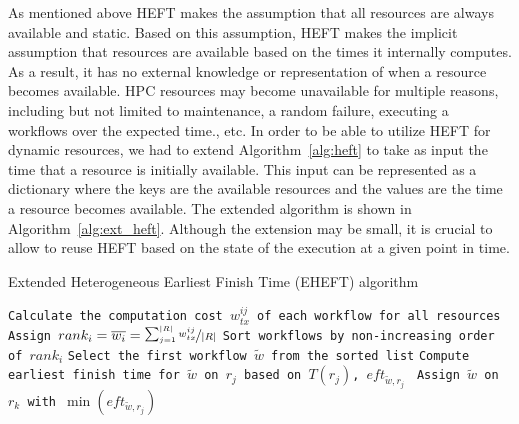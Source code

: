 As mentioned above HEFT makes the assumption that all resources are always available and static.
Based on this assumption, HEFT makes the implicit assumption that resources are available based on the times it internally computes.
As a result, it has no external knowledge or representation of when a resource becomes available.
HPC resources may become unavailable for multiple reasons, including but not limited to maintenance, a random failure, executing a workflows over the expected time., etc.
In order to be able to utilize HEFT for dynamic resources, we had to extend Algorithm~\ref{alg:heft} to take as input the time that a resource is initially available.
This input can be represented as a dictionary where the keys are the available resources and the values are the time a resource becomes available.
The extended algorithm is shown in Algorithm~\ref{alg:ext_heft}.
Although the extension may be small, it is crucial to allow to reuse HEFT based on the state of the execution at a given point in time.

\begin{algorithm}[ht]
    \caption{Extended Heterogeneous Earliest Finish Time (EHEFT) algorithm}
    \label{alg:ext_heft}
    \begin{algorithmic}[1]
        \State \texttt{Calculate the computation cost $w_{tx}^{ij}$ of each workflow for all resources}
        \State \texttt{Assign $rank_i = \overline{w_{i}} = \nicefrac{\sum_{j=1}^{|R|}w_{tx}^{ij}}{|R|}$}
        \State \texttt{Sort workflows by non-increasing order of $rank_i$}
        \State \texttt{Select the first workflow $\tilde{w}$ from the sorted list}
        \State\texttt{Compute earliest finish time for $\tilde{w}$ on $r_{j}$ based on $T(r_j)$, $eft_{\tilde{w},r_j}$ }
        \EndFor
        \State \texttt{Assign  $\tilde{w}$ on $r_k$ with $\min{(eft_{\tilde{w},r_j})}$}
        \EndWhile
        \EndProcedure
    \end{algorithmic}
\end{algorithm}

